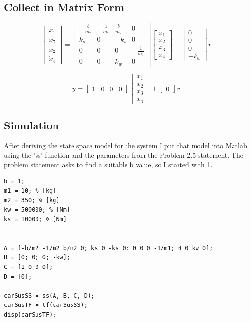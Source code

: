 \documentclass{article}
\begin{document}
\subsection{Collect in Matrix Form}
\[
\begin{bmatrix}
\dot{x}_1 \\
\dot{x}_2 \\
\dot{x}_3 \\
\dot{x}_4
\end{bmatrix}
=
\begin{bmatrix}
-\frac{b}{m_2} & -\frac{1}{m_2} & \frac{b}{m_2} & 0 \\
k_s & 0 & -k_s & 0 \\
0 & 0 & 0 & -\frac{1}{m_1} \\
0 & 0 & k_w & 0
\end{bmatrix}
\begin{bmatrix}
x_1 \\
x_2 \\
x_3 \\
x_4
\end{bmatrix}
+
\begin{bmatrix}
0 \\
0 \\
0 \\
-k_w
\end{bmatrix}
\dot{r}
\]

\[
y = 
\begin{bmatrix}
1 & 0 & 0 & 0
\end{bmatrix}
\begin{bmatrix}
x_1 \\
x_2 \\
x_3 \\
x_4
\end{bmatrix}
+
\begin{bmatrix}
0
\end{bmatrix}
u
\]

\subsection*{Simulation}

After deriving the state space model for the system I put that model into Matlab using the 'ss' function and the parameters from the Problem 2.5 statement.
The problem statement asks to find a suitable b value, so I started with 1.

\begin{lstlisting}[style=matlabstyle]
b = 1;
m1 = 10; % [kg]
m2 = 350; % [kg]
kw = 500000; % [Nm]
ks = 10000; % [Nm]


A = [-b/m2 -1/m2 b/m2 0; ks 0 -ks 0; 0 0 0 -1/m1; 0 0 kw 0]; 
B = [0; 0; 0; -kw];       
C = [1 0 0 0];        
D = [0];  

carSusSS = ss(A, B, C, D);
carSusTF = tf(carSusSS);
disp(carSusTF);
\end{lstlisting}
\end{document}
